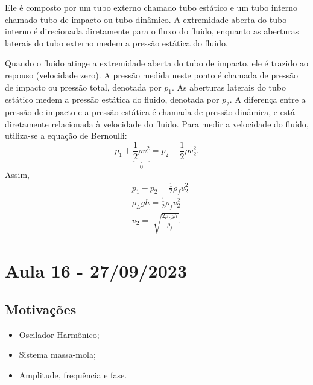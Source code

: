\documentclass{article}
\begin{document}
  Ele é composto por um tubo externo chamado tubo estático e um tubo interno
chamado tubo de impacto ou tubo dinâmico. A extremidade aberta do tubo interno
é direcionada diretamente para o fluxo do fluido, enquanto as aberturas laterais
do tubo externo medem a pressão estática do fluido. 

  Quando o fluido atinge a extremidade aberta do tubo de impacto, ele é trazido
ao repouso (velocidade zero). A pressão medida neste ponto é chamada de pressão 
de impacto ou pressão total, denotada por \(p_{1}\). As aberturas laterais do tubo estático medem a pressão
estática do fluido, denotada por \(p_{2}\). A diferença entre a pressão de impacto e a pressão estática é chamada
de pressão dinâmica, e está diretamente relacionada à velocidade do fluido. Para medir a velocidade
do fluído, utiliza-se a equação de Bernoulli: 
  \[
    p_{1} + \underbrace{\frac{1}{2}\rho v_{1}^{2}}_{0} = p_{2} + \frac{1}{2}\rho v_{2}^{2}.
  \]
  Assim,
 \begin{align*}
   &p_{1}-p_{2} = \frac{1}{2}\rho_{f}v_{2}^{2}\\
   &\rho_{L}gh = \frac{1}{2}\rho_{f}v_{2}^{2}\\
   &v_{2} = \sqrt[]{\frac{2\rho_{L}gh}{\rho_{f}}}.
 \end{align*}
\newpage

\section{Aula 16 - 27/09/2023}
\subsection{Motivações}
 \begin{itemize}
   \item Oscilador Harmônico;
   \item Sistema massa-mola;
   \item Amplitude, frequência e fase.
 \end{itemize}
\end{document}

